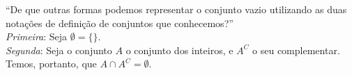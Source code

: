\enquote{De que outras formas podemos representar o conjunto vazio utilizando as duas notações de definição de conjuntos que conhecemos?}
\\
\emph{Primeira}: Seja $\emptyset = \{\}$. \\
\emph{Segunda}: Seja o conjunto $A$ o conjunto dos inteiros, e $A^C$ o seu complementar. Temos, portanto, que $A \cap A^C = \emptyset$.